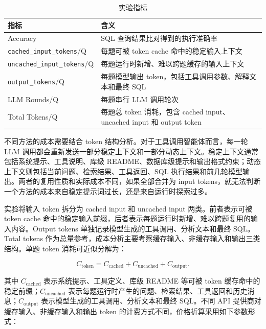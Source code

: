 \documentclass[
    bachelor,
    pdflinks,
]{xjtuthesis}
\newcommand{\topcaption}[1]{\caption{#1}}
\begin{document}
\begin{table}[htbp]\small
  \centering
  \topcaption{实验指标}
  \label{tab:metrics}
  \begin{tabularx}{\textwidth}{lX}
    \toprule[1.5pt]
    \textbf{指标} & \textbf{含义} \\
    \midrule[1pt]
    Accuracy & SQL 查询结果比对得到的执行准确率 \\
    \texttt{cached\_input\_tokens}/Q & 每题可被 token cache 命中的稳定输入上下文 \\
    \texttt{uncached\_input\_tokens}/Q & 每题运行时新增、难以跨题缓存的输入上下文 \\
    \texttt{output\_tokens}/Q & 每题模型输出 token，包括工具调用参数、解释文本和最终 SQL \\
    LLM Rounds/Q & 每题串行 LLM 调用轮次 \\
    Total Tokens/Q & 每题总 token 消耗，包含 cached input、uncached input 和 output token \\
    \bottomrule[1.5pt]
  \end{tabularx}
\end{table}

不同方法的成本需要结合 token 结构分析。对于工具调用智能体而言，每一轮 LLM 调用都会重新发送一部分稳定上下文和一部分动态上下文。稳定上下文通常包括系统提示、工具说明、库级 README、数据库级提示和输出格式约束；动态上下文则包括当前问题、检索结果、工具返回、SQL 执行结果和前几轮模型输出。两者的复用性质和实际成本不同，如果全部合并为 input tokens，就无法判断一个方法的成本来自稳定提示词过长，还是来自运行时探索过多。

实验将输入 token 拆分为 cached input 和 uncached input 两类。前者表示可被 token cache 命中的稳定输入前缀，后者表示每题运行时新增、难以跨题复用的输入内容。Output tokens 单独记录模型生成的工具调用、分析文本和最终 SQL。Total tokens 作为总量参考，成本分析主要考察缓存输入、非缓存输入和输出三类结构。单题 token 消耗可近似分解为：

\begin{equation}
C_{\mathrm{token}} =
C_{\mathrm{cached}}+
C_{\mathrm{uncached}}+
C_{\mathrm{output}} .
\end{equation}

其中 $C_{\mathrm{cached}}$ 表示系统提示、工具定义、库级 README 等可被 token 缓存命中的稳定前缀；$C_{\mathrm{uncached}}$ 表示每题运行时产生的问题、检索结果、工具返回和历史消息；$C_{\mathrm{output}}$ 表示模型生成的工具调用、分析文本和最终 SQL。不同 API 提供商对缓存输入、非缓存输入和输出 token 的计费方式不同，价格折算采用如下参数形式：
\end{document}
